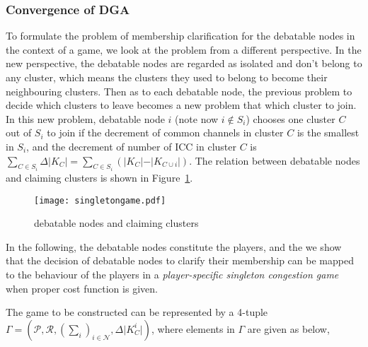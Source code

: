 \subsubsection{Convergence of DGA}
To formulate the problem of membership clarification for the debatable nodes in the context of a game, we look at the problem from a different perspective. 
In the new perspective, the debatable nodes are regarded as isolated and don't belong to any cluster, which means the clusters they used to belong to become their neighbouring clusters. 
Then as to each debatable node, the previous problem to decide which clusters to leave becomes a new problem that which cluster to join.
In this new problem, debatable node $i$ (note now $i\notin S_i$) chooses one cluster $C$ out of $S_i$ to join if the decrement of common channels in cluster $C$ is the  %
smallest in $S_i$, and the decrement of number of ICC in cluster $C$ is $\sum_{C\in S_i}\Delta\vert K_C \vert=\sum_{C\in S_i}({\vert K_{C} \vert-\vert K_{C\cup i} \vert})$. %
The relation between debatable nodes and claiming clusters is shown in Figure~\ref{debatable_nodes_claiming_cluster}.
\begin{figure}[ht!]
  \centering
  \texttt{[image: singletongame.pdf]}
  \caption{debatable nodes and claiming clusters}
  \label{debatable_nodes_claiming_cluster}
\end{figure}

In the following, the debatable nodes constitute the players, and the 
we show that the decision of debatable nodes to clarify their membership can be mapped to the behaviour of the players in a \textit{player-specific singleton congestion game} when proper cost function is given.

The game to be constructed can be represented by a 4-tuple $\Gamma=(\mathcal{P},\mathcal{R},(\sum_i)_{i \in \mathcal{N}},\Delta\vert K^i_C \vert)$, where elements in $\Gamma$ are given as below,

